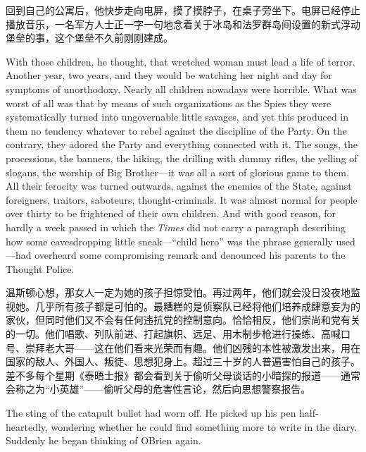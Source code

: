 \begin{paracol}{2}
\switchcolumn

回到自己的公寓后，他快步走向电屏，摸了摸脖子，在桌子旁坐下。电屏已经停止播放音乐，一名军方人士正一字一句地念着关于冰岛和法罗群岛间设置的新式浮动堡垒的事，这个堡垒不久前刚刚建成。

\switchcolumn*

With those children, he thought, that wretched woman must lead a life of
terror. Another year, two years, and they would be watching her night
and day for symptoms of unorthodoxy. Nearly all children nowadays were
horrible. What was worst of all was that by means of such organizations
as the Spies they were systematically turned into ungovernable little
savages, and yet this produced in them no tendency whatever to rebel
against the discipline of the Party. On the contrary, they adored the
Party and everything connected with it. The songs, the processions, the
banners, the hiking, the drilling with dummy rifles, the yelling of
slogans, the worship of Big Brother---it was all a sort of glorious game
to them. All their ferocity was turned outwards, against the enemies of
the State, against foreigners, traitors, saboteurs, thought-criminals.
It was almost normal for people over thirty to be frightened of their
own children. And with good reason, for hardly a week passed in which
the \emph{Times} did not carry a paragraph describing how some
eavesdropping little sneak---``child hero'' was the phrase generally
used---had overheard some compromising remark and denounced his parents
to the Thought Police.

\switchcolumn

温斯顿心想，那女人一定为她的孩子担惊受怕。再过两年，他们就会没日没夜地监视她。几乎所有孩子都是可怕的。最糟糕的是侦察队已经将他们培养成肆意妄为的家伙，但同时他们又不会有任何违抗党的控制意向。恰恰相反，他们崇尚和党有关的一切。他们唱歌、列队前进、打起旗帜、远足、用木制步枪进行操练、高喊口号、崇拜老大哥——这在他们看来光荣而有趣。他们凶残的本性被激发出来，用在国家的敌人、外国人、叛徒、思想犯身上。超过三十岁的人普遍害怕自己的孩子。差不多每个星期《泰晤士报》都会看到关于偷听父母谈话的小暗探的报道——通常会称之为``小英雄''——偷听父母的危害性言论，然后向思想警察报告。

\switchcolumn*

The sting of the catapult bullet had worn off. He picked up his pen
half-heartedly, wondering whether he could find something more to write
in the diary. Suddenly he began thinking of O\textquotesingle Brien
again.

\switchcolumn


\end{paracol}
